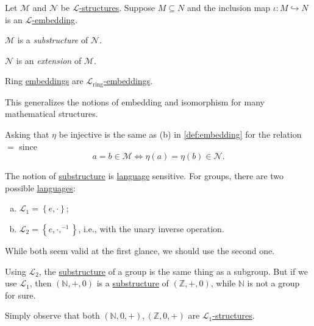 \begin{definition*}
	Let \(\mathcal{M} \) and \(\mathcal{N} \) be \hyperref[def:structure]{\(\mathcal{L} \)-structures}. Suppose \(M \subseteq N\) and the inclusion map \(\iota \colon M \hookrightarrow N\) is an \hyperref[def:embedding]{\(\mathcal{L} \)-embedding}.
	\begin{definition}[Substructure]\label{def:substructure}
		\(\mathcal{M}\) is a \emph{substructure} of \(\mathcal{N} \).
	\end{definition}

	\begin{definition}[Extension]\label{def:extension}
		\(\mathcal{N} \) is an \emph{extension} of \(\mathcal{M} \).
	\end{definition}
\end{definition*}

\begin{eg}
	Ring \hyperref[def:embedding]{embeddings} are \hyperref[def:embedding]{\(\mathcal{L} _{\text{ring} }\)-embeddings}.
\end{eg}

This generalizes the notions of embedding and isomorphism for many mathematical structures.

\begin{remark}
	Asking that \(\eta \) be injective is the same as (b) in \autoref{def:embedding} for the relation \(=\) since
	\[
		a=b \in \mathcal{M} \iff \eta (a) = \eta (b) \in \mathcal{N} .
	\]
\end{remark}

The notion of \hyperref[def:substructure]{substructure} is \hyperref[def:language]{language} sensitive. For groups, there are two possible \hyperref[def:language]{languages}:
\begin{enumerate}[(a)]
	\item \(\mathcal{L} _1 = \left\{ e, \cdot \right\} \);
	\item \(\mathcal{L} _2 = \left\{ e, \cdot, ^{-1} \right\} \), i.e., with the unary inverse operation.
\end{enumerate}
While both seem valid at the first glance, we should use the second one.

\begin{remark}
	Using \(\mathcal{L} _2\), the \hyperref[def:substructure]{substructure} of a group is the same thing as a subgroup. But if we use \(\mathcal{L} _1\), then \((\mathbb{N}, +, 0)\) is a \hyperref[def:substructure]{substructure} of \((\mathbb{Z} , +, 0)\), while \(\mathbb{N} \) is not a group for sure.
\end{remark}
\begin{explanation}
	Simply observe that both \((\mathbb{N} , 0, +), (\mathbb{Z} , 0, +)\) are \hyperref[def:structure]{\(\mathcal{L} _1\)-structures}.
\end{explanation}

